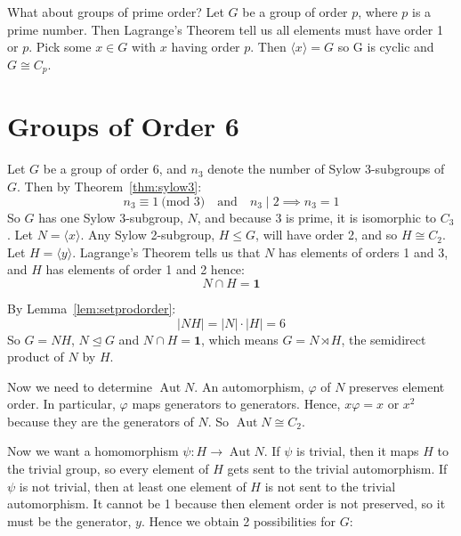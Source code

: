 \documentclass[a4paper, oneside, 12pt, final]{article}
\theoremstyle{definition}
\DeclareMathOperator{\Aut}{Aut}
\newcommand{\nrmsgp}{\unlhd}
\begin{document}
What about groups of prime order?
Let \(G\) be a group of order \(p\), where \(p\) is a prime number.
Then Lagrange's Theorem tell us all elements must have order 1 or \(p\).
Pick some \(x \in G\) with \(x\) having order \(p\).
Then \(\langle x \rangle = G\) so G is cyclic and \(G \cong C_p\).

\section{Groups of Order 6}
Let \(G\) be a group of order 6, and \(n_3\) denote the number of Sylow 3-subgroups of \(G\).
Then by Theorem~\ref{thm:sylow3}:
\[n_3 \equiv 1 \ \text{(mod 3)} \quad \text{and} \quad n_3 \mid 2 \implies n_3 = 1\]
So \(G\) has one Sylow 3-subgroup, \(N\), and because 3 is prime, it is isomorphic to \(C_3\).
Let \(N = \langle x \rangle\).
Any Sylow 2-subgroup, \(H \leqslant G\), will have order 2, and so \(H \cong C_2\).
Let \(H = \langle y \rangle\).
Lagrange's Theorem tells us that \(N\) has elements of orders 1 and 3, and \(H\) has elements of
order 1 and 2 hence:
\[N \cap H = \bm{1}\]

By Lemma~\ref{lem:setprodorder}:
\[|NH| = |N| \cdot |H| = 6\]
So \(G = NH\), \(N \nrmsgp G\) and \(N \cap H = \bm{1}\), which means \(G = N \rtimes H\), the
semidirect product of \(N\) by \(H\).

Now we need to determine \(\Aut{N}\).
An automorphism, \(\varphi\) of \(N\) preserves element order.
In particular, \(\varphi\) maps generators to generators.
Hence, \(x\varphi = x\) or \(x^2\) because they are the generators of \(N\).
So \(\Aut{N} \cong C_2\).

Now we want a homomorphism \(\psi:H \to \Aut{N}\).
If \(\psi\) is trivial, then it maps \(H\) to the trivial group, so every element of \(H\) gets sent
to the trivial automorphism.
If \(\psi\) is not trivial, then at least one element of \(H\) is not sent to the trivial
automorphism.
It cannot be 1 because then element order is not preserved, so it must be the generator, \(y\).
Hence we obtain 2 possibilities for \(G\):
\end{document}
